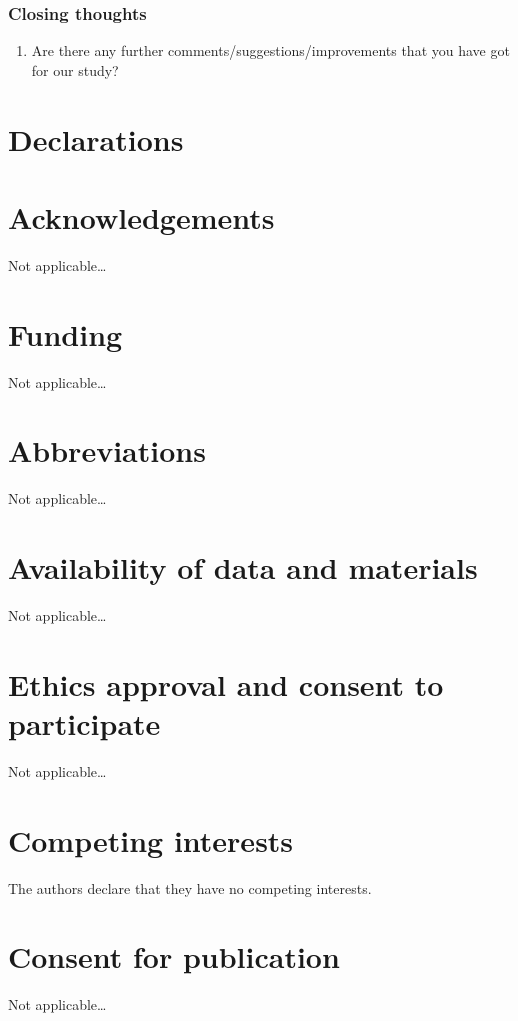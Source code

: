 \documentclass{bmcart}
\begin{document}
\begin{backmatter}
\subsubsection{\textbf{Closing thoughts}}

\begin{enumerate}
    \item Are there any further comments/suggestions/improvements that you have got for our study?
\end{enumerate}

\section{Declarations}

\section*{Acknowledgements}%
Not applicable\ldots

\section*{Funding}%
Not applicable\ldots

\section*{Abbreviations}%
Not applicable\ldots

\section*{Availability of data and materials}%
Not applicable\ldots

\section*{Ethics approval and consent to participate}%
Not applicable\ldots

\section*{Competing interests}
The authors declare that they have no competing interests.

\section*{Consent for publication}%
Not applicable\ldots


\end{backmatter}
\end{document}
